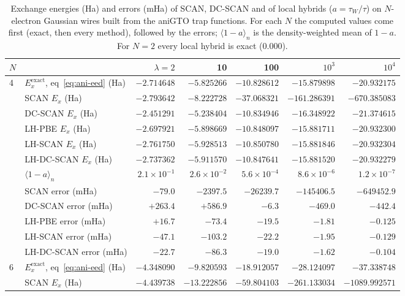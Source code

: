 \documentclass[journal=jctcce,manuscript=suppinfo]{achemso}
\begin{document}
\begin{table}[H]
\centering
\caption{Exchange energies (Ha) and errors (mHa) of SCAN, DC-SCAN and of local
  hybrids ($a=\tau_W/\tau$) on $N$-electron Gaussian wires built from the aniGTO
  trap functions.  For each $N$ the computed values come first (exact, then every
  method), followed by the errors;
  $\langle1-a\rangle_n$ is the density-weighted mean of $1-a$.  For $N=2$
  every local hybrid is exact ($0.000$).}
\label{tab:dcscan-lh}
\scriptsize
\begin{tabular}{@{}llrrrrr@{}}
\toprule
$N$ & & $\lambda=2$ & 10 & 100 & $10^3$ & $10^4$ \\
\midrule
4 & $E_x^{\mathrm{exact}}$, eq~\ref{eq:ani-eed} (Ha) & $-2.714648$ & $-5.825266$ & $-10.828612$ & $-15.879898$ & $-20.932175$ \\
  & SCAN $E_x$ (Ha) & $-2.793642$ & $-8.222728$ & $-37.068321$ & $-161.286391$ & $-670.385083$ \\
  & DC-SCAN $E_x$ (Ha) & $-2.451291$ & $-5.238404$ & $-10.834946$ & $-16.348922$ & $-21.374615$ \\
  & LH-PBE $E_x$ (Ha) & $-2.697921$ & $-5.898669$ & $-10.848097$ & $-15.881711$ & $-20.932300$ \\
  & LH-SCAN $E_x$ (Ha) & $-2.761750$ & $-5.928513$ & $-10.850780$ & $-15.881846$ & $-20.932304$ \\
  & LH-DC-SCAN $E_x$ (Ha) & $-2.737362$ & $-5.911570$ & $-10.847641$ & $-15.881520$ & $-20.932279$ \\
  & $\langle1-a\rangle_n$ & $2.1\times10^{-1}$ & $2.6\times10^{-2}$ & $5.6\times10^{-4}$ & $8.6\times10^{-6}$ & $1.2\times10^{-7}$ \\
  & SCAN error (mHa) & $-79.0$ & $-2397.5$ & $-26239.7$ & $-145406.5$ & $-649452.9$ \\
  & DC-SCAN error (mHa) & $+263.4$ & $+586.9$ & $-6.3$ & $-469.0$ & $-442.4$ \\
  & LH-PBE error (mHa) & $+16.7$ & $-73.4$ & $-19.5$ & $-1.81$ & $-0.125$ \\
  & LH-SCAN error (mHa) & $-47.1$ & $-103.2$ & $-22.2$ & $-1.95$ & $-0.129$ \\
  & LH-DC-SCAN error (mHa) & $-22.7$ & $-86.3$ & $-19.0$ & $-1.62$ & $-0.104$ \\
\midrule
6 & $E_x^{\mathrm{exact}}$, eq~\ref{eq:ani-eed} (Ha) & $-4.348090$ & $-9.820593$ & $-18.912057$ & $-28.124097$ & $-37.338748$ \\
  & SCAN $E_x$ (Ha) & $-4.439738$ & $-13.222856$ & $-59.804103$ & $-261.133034$ & $-1089.992571$ \\

\end{tabular}
\end{table}
\end{document}
